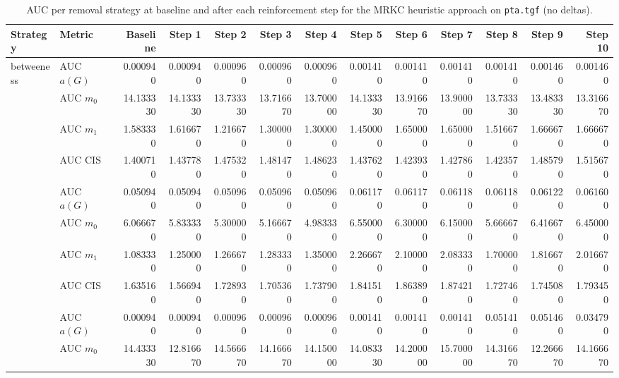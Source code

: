 \begin{table}[htbp]
  \centering
  \caption{AUC per removal strategy at baseline and after each reinforcement step for the MRKC heuristic approach on \texttt{pta.tgf} (no deltas).}
  \label{tab:pta-mrkc_heuristic-auc}
\setlength{\tabcolsep}{2.5pt}
  \begin{tabular}{llrrrrrrrrrrr}
    \toprule
    \textbf{Strategy} & \textbf{Metric} & \textbf{Baseline} & \textbf{Step 1} & \textbf{Step 2} & \textbf{Step 3} & \textbf{Step 4} & \textbf{Step 5} & \textbf{Step 6} & \textbf{Step 7} & \textbf{Step 8} & \textbf{Step 9} & \textbf{Step 10} \\
    \midrule
    \multirow{4}{*}{betweeness} & AUC $a(G)$ & 0.000940 & 0.000940 & 0.000960 & 0.000960 & 0.000960 & 0.001410 & 0.001410 & 0.001410 & 0.001410 & 0.001460 & 0.001460 \\
    & AUC $m_0$ & 14.133330 & 14.133330 & 13.733330 & 13.716670 & 13.700000 & 14.133330 & 13.916670 & 13.900000 & 13.733330 & 13.483330 & 13.316670 \\
    & AUC $m_1$ & 1.583330 & 1.616670 & 1.216670 & 1.300000 & 1.300000 & 1.450000 & 1.650000 & 1.650000 & 1.516670 & 1.666670 & 1.666670 \\
    & AUC CIS & 1.400710 & 1.437780 & 1.475320 & 1.481470 & 1.486230 & 1.437620 & 1.423930 & 1.427860 & 1.423570 & 1.485790 & 1.515670 \\
    \addlinespace
    \multirow{4}{*}{closeness} & AUC $a(G)$ & 0.050940 & 0.050940 & 0.050960 & 0.050960 & 0.050960 & 0.061170 & 0.061170 & 0.061180 & 0.061180 & 0.061220 & 0.061600 \\
    & AUC $m_0$ & 6.066670 & 5.833330 & 5.300000 & 5.166670 & 4.983330 & 6.550000 & 6.300000 & 6.150000 & 5.666670 & 6.416670 & 6.450000 \\
    & AUC $m_1$ & 1.083330 & 1.250000 & 1.266670 & 1.283330 & 1.350000 & 2.266670 & 2.100000 & 2.083330 & 1.700000 & 1.816670 & 2.016670 \\
    & AUC CIS & 1.635160 & 1.566940 & 1.728930 & 1.705360 & 1.737900 & 1.841510 & 1.863890 & 1.874210 & 1.727460 & 1.745080 & 1.793450 \\
    \addlinespace
    \multirow{4}{*}{core influence} & AUC $a(G)$ & 0.000940 & 0.000940 & 0.000960 & 0.000960 & 0.000960 & 0.001410 & 0.001410 & 0.001410 & 0.051410 & 0.051460 & 0.034790 \\
    & AUC $m_0$ & 14.433330 & 12.816670 & 14.566670 & 14.166670 & 14.150000 & 14.083330 & 14.200000 & 15.700000 & 14.316670 & 12.266670 & 14.166670 \\

\end{tabular}
\end{table}
